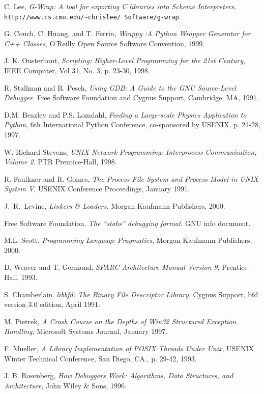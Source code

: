 \begin{thebibliography}{99}
 C. Lee, {\em G-Wrap: A tool for exporting C libraries into Scheme Interpreters},\\
{\tt http://www.cs.cmu.edu/\~{ }chrislee/
Software/g-wrap}.

 G. Couch, C. Huang, and T. Ferrin, {\em Wrappy :A Python Wrapper
Generator for C++ Classes}, O'Reilly Open Source Software Convention, 1999.

 J. K. Ousterhout, {\em Scripting: Higher-Level Programming for the 21st Century},
IEEE Computer, Vol 31, No. 3, p. 23-30, 1998.

 R. Stallman and R. Pesch, {\em Using GDB: A Guide to the GNU Source-Level Debugger}.
Free Software Foundation and Cygnus Support, Cambridge, MA, 1991.

 D.M. Beazley and P.S. Lomdahl, {\em Feeding a
Large-scale Physics Application to Python}, 6th International Python
Conference, co-sponsored by USENIX, p. 21-28, 1997.

 W. Richard Stevens, {\em UNIX Network Programming: Interprocess Communication, Volume 2}. PTR
Prentice-Hall, 1998. 

 R. Faulkner and R. Gomes, {\em The Process File System and Process Model in UNIX System V}, USENIX Conference Proceedings,
January 1991. 

 J.~R.~Levine, {\em Linkers \& Loaders.} Morgan Kaufmann Publishers, 2000.

 Free Software Foundation, {\em The ``stabs'' debugging format}. GNU info document.

 M.L. Scott. {\em Programming Language Pragmatics}, Morgan Kaufmann Publishers, 2000.

 D. Weaver and T. Germond, {\em SPARC Architecture Manual Version 9},
Prentice-Hall, 1993.

 S. Chamberlain. {\em libbfd: The Binary File Descriptor Library}. Cygnus Support, bfd version 3.0 edition, April 1991. 

 M. Pietrek, {\em A Crash Course on the Depths of Win32 Structured Exception Handling}, 
Microsoft Systems Journal, January 1997.

 F. Mueller, {\em A Library Implementation of POSIX Threads Under Unix},
USENIX Winter Technical Conference, San Diego, CA., p. 29-42, 1993.

 J. B. Rosenberg, {\em How Debuggers Work: Algorithms, Data Structures, and
Architecture}, John Wiley \& Sons, 1996.


\end{thebibliography}
